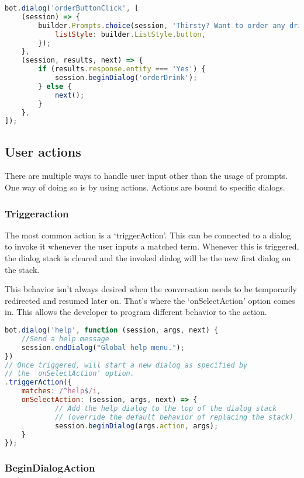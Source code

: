 \begin{lstlisting}[language=JavaScript,caption=2-step waterfall using a prompt,label=listing:waterfall-and-prompt]
bot.dialog('orderButtonClick', [
	(session) => {
		builder.Prompts.choice(session, 'Thirsty? Want to order any drinks?', 'Yes|No drinks', {
			listStyle: builder.ListStyle.button,
		});
	},
	(session, results, next) => {
		if (results.response.entity === 'Yes') {
			session.beginDialog('orderDrink');
		} else {
			next();
		}
	},
]);
\end{lstlisting}

\subsection{User actions}

There are multiple ways to handle user input other than the usage of prompts. One way of doing so is by using actions. Actions are bound to specific dialogs.

\subsubsection{Triggeraction}

The most common action is a `triggerAction'. This can be connected to a dialog to invoke it whenever the user inputs a matched term. Whenever this is triggered, the dialog stack is cleared and the invoked dialog will be the new first dialog on the stack.

This behavior isn't always desired when the conversation needs to be temporarily redirected and resumed later on. That's where the `onSelectAction' option comes in. This allows the developer to program different behavior to the action.

\begin{lstlisting}[language=JavaScript,caption=triggerAction being bound to a dialog and its behavior overwritten by onSelectAction,label=listing:triggerAction]
bot.dialog('help', function (session, args, next) {
	//Send a help message
	session.endDialog("Global help menu.");
})
// Once triggered, will start a new dialog as specified by
// the 'onSelectAction' option.
.triggerAction({
	matches: /^help$/i,
	onSelectAction: (session, args, next) => {
			// Add the help dialog to the top of the dialog stack 
			// (override the default behavior of replacing the stack)
			session.beginDialog(args.action, args);
	}
});
\end{lstlisting}

\subsubsection{BeginDialogAction}

